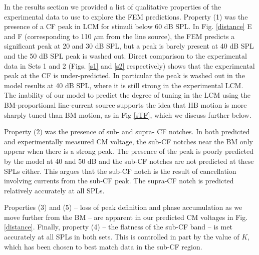 \documentclass{biophys-new}
\begin{document}
\par{
In the results section we provided a list of qualitative properties of the experimental data to use to explore the FEM predictions.  Property (1) was the presence of a CF peak in LCM for stimuli below 60 dB SPL. In Fig. \ref{distance} E and F (corresponding to 110 $\mu$m from the line source), the FEM predicts a significant peak at 20 and 30 dB SPL, but a peak is barely present at 40 dB SPL and the 50 dB SPL peak is washed out.   Direct comparison to the experimental data in Sets 1 and 2 (Figs. \ref{s1} and \ref{s2} respectively) shows that the experimental peak at the CF is under-predicted.  In particular the peak is washed out in the model results at 40 dB SPL, where it is still strong in the experimental LCM.  The inability of our model to predict the  degree of tuning in the LCM using the BM-proportional line-current source supports the idea that HB motion is more sharply tuned than BM motion, as in Fig \ref{sTF}, which we discuss further below.} 
\par{Property (2) was the presence of sub- and supra- CF notches.  In both predicted and experimentally measured CM voltage, the sub-CF notches near the BM only appear when there is a strong peak. The presence of the peak is poorly predicted by the model at 40 and 50 dB and the sub-CF notches are not predicted at these SPLs either. This argues that the sub-CF notch is the result of cancellation involving currents from the sub-CF peak. The supra-CF notch is predicted relatively accurately at all SPLs.} 

\par{Properties (3) and (5) -- loss of peak definition and phase accumulation as we move further from the BM -- are apparent in our predicted CM voltages in Fig. \ref{distance}.  Finally, property (4) -- the flatness of the sub-CF band -- is met accurately at all SPLs in both sets. This is controlled in part by the value of $K$, which has been chosen to best match data in the sub-CF region.}
\end{document}
